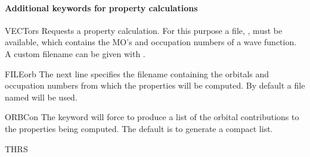 \paragraph{Additional keywords for property calculations}
\begin{keywordlist}
\item[VECTors]
Requests a property calculation. For this purpose a file,
,
must be available, which contains the MO's and occupation numbers
of a wave function. A custom filename can be given with .
\item[FILEorb]
The next line specifies the filename containing the orbitals and occupation numbers
from which the properties will be computed. By default a file named 
will be used.
\item[ORBCon]
The keyword will force 
to produce a list of the orbital
contributions to the properties being computed. The default is to
generate a compact list.
\item[THRS]

\end{keywordlist}
